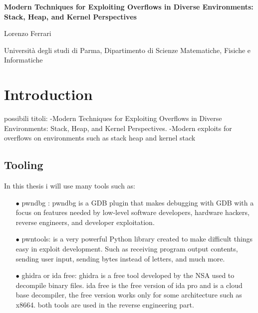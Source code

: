 \documentclass{report}
\begin{document}
\begin{titlepage}
    \centering
    \vspace*{\fill}
    \Huge \textbf{Modern Techniques for Exploiting Overflows in Diverse Environments: Stack, Heap, and Kernel Perspectives}
    \vspace{2cm} 
    
    \Large Lorenzo Ferrari


    \vspace{2cm} %
    
    \Large Università degli studi di Parma, Dipartimento di Scienze Matematiche, Fisiche e Informatiche

    
 
\end{titlepage}
\newpage

\mbox{} %
\newpage

\renewcommand{\contentsname}{Index}
\tableofcontents
    
    
    
    \chapter{Introduction}
    possibili titoli: \newline
    -Modern Techniques for Exploiting Overflows in Diverse Environments: Stack, Heap, and Kernel Perspectives.
    -Modern exploits for overflows on environments such as stack heap and kernel stack
    \section{Tooling}
    In this thesis i will use many tools such as: 
       \begin{itemize}
        \item[$\bullet$] pwndbg : pwndbg is a GDB plugin that makes debugging with GDB with a focus on features needed by low-level software developers, hardware hackers, reverse engineers, and developer exploitation.\newline
        \item[$\bullet$]pwntools: is a very powerful Python library created to make difficult things easy in exploit development.\newline
        Such as receiving program output contents, sending user input, sending bytes instead of letters, and much more.\newline
        \item[$\bullet$] ghidra or ida free: 
        ghidra is a free tool developed by the NSA used to decompile binary files.
        ida free is the free version of ida pro and is a cloud base decompiler, the free version works only for some architecture such as x8664.\newline
        both tools are used in the reverse engineering part.\newline
    \end{itemize}
    
\end{document}
